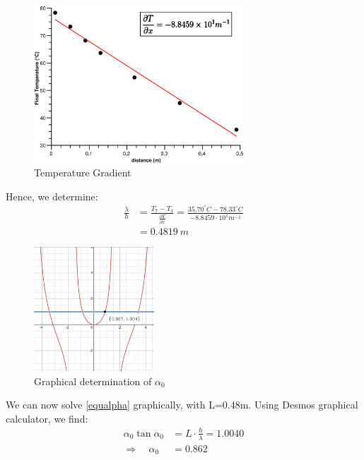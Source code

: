 \documentclass{scrartcl}
\begin{document}
\begin{figure}[H]
    \centering
    \includegraphics[width=0.7\textwidth]{gradientT.eps}
    \caption{Temperature Gradient}
    \label{fig:my_label}
\end{figure}

Hence, we determine:
\begin{align*}
    \frac{\lambda}{h} &=\frac{T_7-T_1}{\frac{\partial T}{\partial x}} =\frac{35.70^{\circ}C-78.33^{\circ}C}{-8.8459\cdot 10^1 m^{-1}} \\
    &=0.4819 \ m 
\end{align*}


\begin{figure}
    \centering
    \includegraphics[width=0.4\textwidth]{xtanx.PNG}
    \caption{Graphical determination of $\alpha_0$}
    \label{fig:aplha0}
\end{figure}

We can now solve \ref{equalpha} graphically, with L=0.48m. Using Desmos graphical calculator, we find:
\begin{align*}
    \alpha_0\tan\alpha_0&=L\cdot\frac{h}{\lambda}=1.0040\\
    \Rightarrow\quad\alpha_0&=0.862
\end{align*}

\vspace{2cm}
\end{document}
